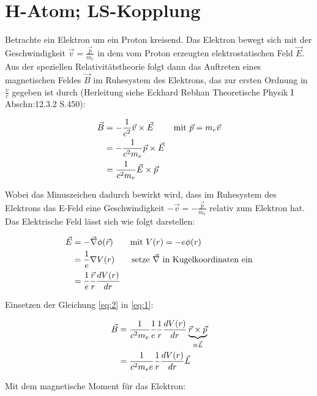 
\usepackage{amsmath} 



\section*{H-Atom; LS-Kopplung}

Betrachte ein Elektron um ein Proton kreisend. Das Elektron bewegt sich mit der Geschwindigkeit \(\vec v=\frac{\vec p}{m_e}\) in dem vom Proton erzeugten elektrostatischen Feld \(\vec E\). Aus der speziellen Relativitätstheorie folgt dann das Auftreten eines magnetischen Feldes \(\vec B\) im Ruhesystem des Elektrons, das zur ersten Ordnung in \(\frac{v}{c}\) gegeben ist durch (Herleitung siehe Eckhard Rebhan Theoretische Physik I Abschn:12.3.2 S.450):

\begin{align}
  \vec B &= -\frac{1}{c^2}\vec v\times \vec E \qquad \text{ mit } \vec p = m_e\vec v \notag \\
&= -\frac{1}{c^2 m_e}\vec p\times \vec E \notag \\
&= \frac{1}{c^2 m_e}\vec E\times \vec p  \label{eq:1}
\end{align}

Wobei das Minuszeichen dadurch bewirkt wird, dass im Ruhesystem des Elektrons das E-Feld eine Geschwindigkeit \(-\vec v = -\frac{\vec p}{m_e}\) relativ zum Elektron hat. Das Elektrische Feld lässt sich wie folgt darstellen:

\begin{align}
  \label{eq:2}
  \vec E &= -\vec\nabla\phi(\vec r) \qquad \text{mit } V(r) = -e\phi(r)  \notag \\
&= \frac{1}{e} \nabla V(r) \qquad \text{setze }\vec\nabla\text{ in Kugelkoordinaten ein}\notag \\
 &= \frac{1}{e}\frac{\vec r}{r} \frac{dV(r)}{dr}
\end{align}

Einsetzen der Gleichung \eqref{eq:2} in \eqref{eq:1}:

\begin{align}
  \label{eq:3}
\vec B  &= \frac{1}{c^2 m_e} \frac{1}{e}\frac{1}{r} \frac{dV(r)}{dr}\underbrace{ \vec r \times \vec p}_{\equiv \vec L} \notag\\
&= \frac{1}{c^2 m_e e}\frac{1}{r} \frac{dV(r)}{dr}\vec L
\end{align}


Mit dem magnetische Moment für das Elektron:

